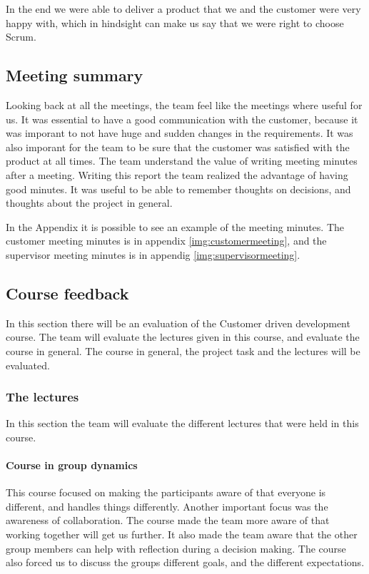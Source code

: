 In the end we were able to deliver a product that we and the customer were very happy with, which in hindsight can make us say that we were right to choose Scrum.

\subsection{Meeting summary}
Looking back at all the meetings, the team feel like the meetings where useful for us. It was essential to have a good communication with the customer, because it was imporant to not have huge and sudden changes in the requirements. It was also imporant for the team to be sure that the customer was satisfied with the product at all times. The team understand the value of writing meeting minutes after a meeting. Writing this report the team realized the advantage of having good minutes. It was useful to be able to remember thoughts on decisions, and thoughts about the project in general.

In the Appendix it is possible to see an example of the meeting minutes. The customer meeting minutes is in appendix \ref{img:customermeeting}, and the supervisor meeting minutes is in appendig \ref{img:supervisormeeting}. 
\subsection{Course feedback}
In this section there will be an evaluation of the Customer driven development course. The team will evaluate the lectures given in this course, and evaluate the course in general.
The course in general, the project task and the lectures will be evaluated.

\subsubsection{The lectures}
In this section the team will evaluate the different lectures that were held in this course.

\paragraph{Course in group dynamics}
This course focused on making the participants aware of that everyone is different, and handles things differently. Another important focus was the awareness of collaboration. The course made the team more aware of that working together will get us further. It also made the team aware that the other group members can help with reflection during a decision making. The course also forced us to discuss the groups different goals, and the different expectations. 

